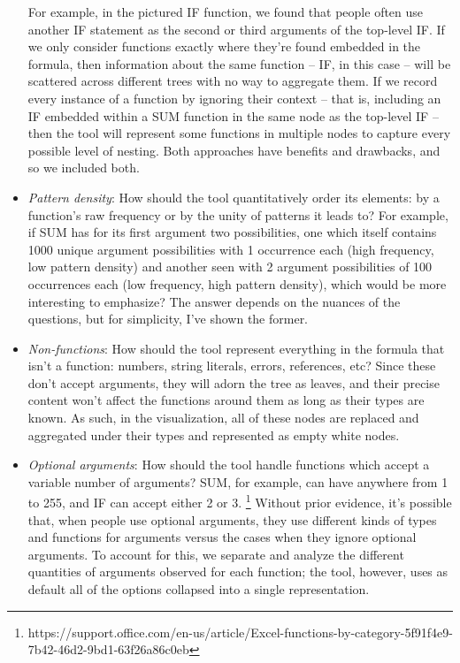 \documentclass[conference]{IEEEtran}
\begin{document}
\begin{itemize}
		\par For example, in the pictured IF function, we found that people often use
		another IF statement as the second or third arguments of the top-level IF. If
		we only consider functions exactly where they're found embedded in the
		formula, then information about the same function -- IF, in this case -- will
		be scattered across different trees with no way to aggregate them. If we
		record every instance of a function by ignoring their context -- that is,
		including an IF embedded within a SUM function in the same node as the
		top-level IF -- then the tool will represent some functions in multiple nodes
		to capture every possible level of nesting. Both approaches have benefits and
		drawbacks, and so we included both. \item \textit{Pattern density}: How should
		the tool quantitatively order its elements: by a function's raw frequency or
		by the unity of patterns it leads to? For example, if SUM has for its first
		argument two possibilities, one which itself contains 1000 unique argument
		possibilities with 1 occurrence each (high frequency, low pattern density) and
		another seen with 2 argument possibilities of 100 occurrences each (low
		frequency, high pattern density), which would be more interesting to
		emphasize? The answer depends on the nuances of the questions, but for
		simplicity, I've shown the former. \item \textit{Non-functions}: How should
		the tool represent everything in the formula that isn't a function: numbers,
		string literals, errors, references, etc? Since these don't accept arguments,
		they will adorn the tree as leaves, and their precise content won't affect the
		functions around them as long as their types are known. As such, in the
		visualization, all of these nodes are replaced and aggregated under their
		types and represented as empty white nodes. \item \textit{Optional arguments}:
		How should the tool handle functions which accept a variable number of
		arguments? SUM, for example, can have anywhere from 1 to 255, and IF can
		accept either 2 or 3.
		\footnote{https://support.office.com/en-us/article/Excel-functions-by-category-5f91f4e9-7b42-46d2-9bd1-63f26a86c0eb} Without prior evidence, it's possible that, when people use optional arguments, they use different kinds of types and functions for arguments versus the cases when they ignore optional arguments. To account for this, we separate and analyze the different quantities of arguments observed for each function; the tool, however, uses as default all of the options collapsed into a single representation. \end{itemize}
	
\end{document}
